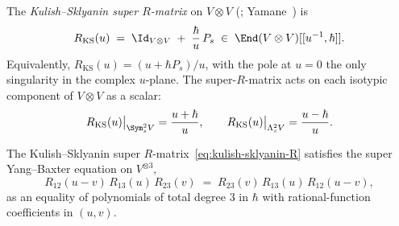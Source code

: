 \begin{definition}
\label{def:kulish-sklyanin-R}
The \emph{Kulish--Sklyanin super $R$-matrix} on $V \otimes V$
(\cite{KulishSklyanin1980}; Yamane~\cite{Yamane1999}) is
\begin{equation}\label{eq:kulish-sklyanin-R}
 R_{\mathrm{KS}}(u)
 \;=\; \Id_{V \otimes V} \;+\; \frac{\hbar}{u}\, P_s
 \;\in\; \End(V \otimes V)[[u^{-1}, \hbar]].
\end{equation}
Equivalently, $R_{\mathrm{KS}}(u) = (u + \hbar P_s)/u$, with the pole
at $u = 0$ the only singularity in the complex $u$-plane. The
super-$R$-matrix acts on each isotypic component of $V \otimes V$ as
a scalar:
\[
 R_{\mathrm{KS}}(u)\bigr|_{\Sym^2_s V}
 = \frac{u + \hbar}{u},
 \qquad
 R_{\mathrm{KS}}(u)\bigr|_{\Lambda^2_s V}
 = \frac{u - \hbar}{u}.
\]
\end{definition}

\begin{theorem}
\label{thm:super-ybe-ks}
The Kulish--Sklyanin super $R$-matrix~\eqref{eq:kulish-sklyanin-R}
satisfies the super Yang--Baxter equation on $V^{\otimes 3}$,
\begin{equation}\label{eq:super-ybe}
 R_{12}(u - v)\, R_{13}(u)\, R_{23}(v)
 \;=\;
 R_{23}(v)\, R_{13}(u)\, R_{12}(u - v),
\end{equation}
as an equality of polynomials of total degree $3$ in $\hbar$ with
rational-function coefficients in $(u, v)$.
\end{theorem}


